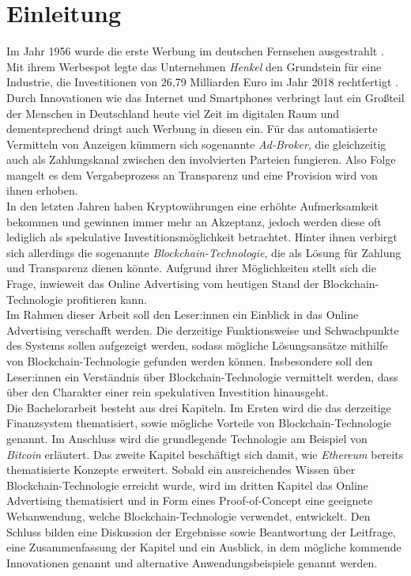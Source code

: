 \chapter{Einleitung}
Im Jahr 1956 wurde die erste Werbung im deutschen Fernsehen ausgestrahlt \cite{tagesspiegel_2016}. Mit ihrem Werbespot legte das Unternehmen \emph{Henkel} den Grundstein für eine Industrie, die Investitionen von 26,79 Milliarden Euro im Jahr 2018 rechtfertigt \cite{statista_werbung_2020}. Durch Innovationen wie das Internet und Smartphones verbringt laut \cite{statista_internetnutzung_2020} ein Großteil der Menschen in Deutschland heute viel Zeit im digitalen Raum und dementsprechend dringt auch Werbung in diesen ein. Für das automatisierte Vermitteln von Anzeigen kümmern sich sogenannte \emph{Ad-Broker}, die gleichzeitig auch als Zahlungskanal zwischen den involvierten Parteien fungieren. Also Folge mangelt es dem Vergabeprozess an Transparenz und eine Provision wird von ihnen erhoben.\\

In den letzten Jahren haben Kryptowährungen eine erhöhte Aufmerksamkeit bekommen und gewinnen immer mehr an Akzeptanz, jedoch werden diese oft lediglich als spekulative Investitionsmöglichkeit betrachtet. Hinter ihnen verbirgt sich allerdings die sogenannte \emph{Blockchain-Technologie}, die als Lösung für Zahlung und Transparenz dienen könnte. Aufgrund ihrer Möglichkeiten stellt sich die Frage, inwieweit das Online Advertising vom heutigen Stand der Blockchain-Technologie profitieren kann.\\

Im Rahmen dieser Arbeit soll den Leser:innen ein Einblick in das Online Advertising verschafft werden. Die derzeitige Funktionsweise und Schwachpunkte des Systems sollen aufgezeigt werden, sodass mögliche Lösungsansätze mithilfe von Blockchain-Technologie gefunden werden können. Insbesondere soll den Leser:innen ein Verständnis über Blockchain-Technologie vermittelt werden, dass über den Charakter einer rein spekulativen Investition hinausgeht.\\

Die Bachelorarbeit besteht aus drei Kapiteln. Im Ersten wird die das derzeitige Finanzsystem thematisiert, sowie mögliche Vorteile von Blockchain-Technologie genannt. Im Anschluss wird die grundlegende Technologie am Beispiel von \emph{Bitcoin} erläutert. Das zweite Kapitel beschäftigt sich damit, wie \emph{Ethereum} bereits thematisierte Konzepte erweitert. Sobald ein ausreichendes Wissen über Blockchain-Technologie erreicht wurde, wird im dritten Kapitel das Online Advertising thematisiert und in Form eines Proof-of-Concept eine geeignete Webanwendung, welche Blockchain-Technologie verwendet, entwickelt. Den Schluss bilden eine Diskussion der Ergebnisse sowie Beantwortung der Leitfrage, eine Zusammenfassung der Kapitel und ein Ausblick, in dem mögliche kommende Innovationen genannt und alternative Anwendungsbeispiele genannt werden. 

